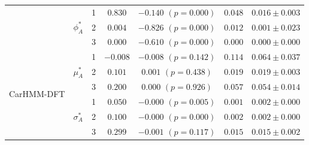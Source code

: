 \documentclass{article}
\begin{document}
\begin{center}
{\begin{tabular}{ccccccc}
                            & \multirow{3}{*}{$\phi_A^*$}   & 1                                & $0.830$                         & $-0.140$ $(p=0.000)$          & $0.048$                             & $0.016 \pm 0.003$                             \\
                            &                               & 2                                & $0.004$                         & $-0.826$ $(p=0.000)$          & $0.012$                             & $0.001 \pm 0.023$                             \\
                            &                               & 3                                & $0.000$                         & $-0.610$ $(p=0.000)$          & $0.000$                             & $0.000 \pm 0.000$                             \\ \hline
\multirow{9}{*}{CarHMM-DFT} & \multirow{3}{*}{$\mu_A^*$}    & 1                                & $-0.008$                         & $-0.008$ $(p=0.142)$          & $0.114$                             & $0.064 \pm 0.037$                             \\
                            &                               & 2                                & $0.101$                         & $0.001$ $(p=0.438)$          & $0.019$                             & $0.019 \pm 0.003$                             \\
                            &                               & 3                                & $0.200$                         & $0.000$ $(p=0.926)$          & $0.057$                             & $0.054 \pm 0.014$                             \\
                            & \multirow{3}{*}{$\sigma_A^*$} & 1                                & $0.050$                         & $-0.000$ $(p=0.005)$          & $0.001$                             & $0.002 \pm 0.000$                             \\
                            &                               & 2                                & $0.100$                         & $-0.000$ $(p=0.000)$          & $0.002$                             & $0.002 \pm 0.000$                             \\ 
                            &                               & 3                                & $0.299$                         & $-0.001$ $(p=0.117)$          & $0.015$                             & $0.015 \pm 0.002$                             \\

\end{tabular}}
\end{center}
\end{document}
